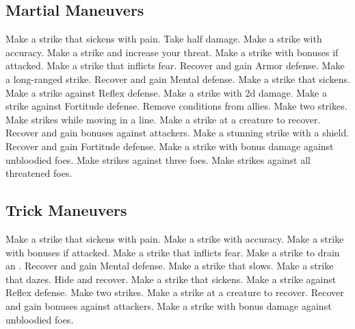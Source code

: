 \subsection{Martial Maneuvers}\label{Martial Maneuvers}
\begin{spelllist}
 Make a strike that sickens with pain.
 Take half damage.
 Make a strike with  accuracy.
 Make a strike and increase your threat.
 Make a strike with bonuses if attacked.
 Make a strike that inflicts fear.
 Recover and gain  Armor defense.
 Make a long-ranged strike.
 Recover and gain  Mental defense.
 Make a strike that sickens.
 Make a strike against Reflex defense.
 Make a strike with \plus2d damage.
 Make a strike against Fortitude defense.
 Remove conditions from allies.
 Make two strikes.
 Make strikes while moving in a line.
 Make a strike at a creature to recover.
 Recover and gain bonuses against attackers.
 Make a stunning strike with a shield.
 Recover and gain  Fortitude defense.
 Make a strike with bonus damage against unbloodied foes.
 Make strikes against three foes.
 Make strikes against all threatened foes.
\end{spelllist}



\small
\subsection{Trick Maneuvers}\label{Trick Maneuvers}
\begin{spelllist}
 Make a strike that sickens with pain.
 Make a strike with  accuracy.
 Make a strike with bonuses if attacked.
 Make a strike that inflicts fear.
 Make a strike to drain an .
 Recover and gain  Mental defense.
 Make a strike that slows.
 Make a strike that dazes.
 Hide and recover.
 Make a strike that sickens.
 Make a strike against Reflex defense.
 Make two strikes.
 Make a strike at a creature to recover.
 Recover and gain bonuses against attackers.
 Make a strike with bonus damage against unbloodied foes.
\end{spelllist}



